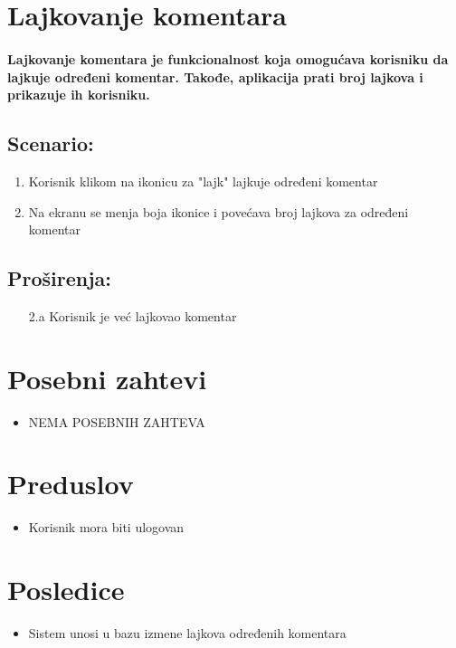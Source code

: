 \section{Lajkovanje komentara}
\paragraph{
Lajkovanje komentara je funkcionalnost koja omogućava korisniku da lajkuje određeni komentar. Takođe, aplikacija prati broj lajkova i prikazuje ih korisniku.
}

\subsection{\textbf{Scenario:}}
\begin{enumerate}
    \item Korisnik klikom na ikonicu za "lajk" lajkuje određeni komentar
    \item Na ekranu se menja boja ikonice i povećava broj lajkova za određeni komentar
\end{enumerate}
\newpage
\subsection{\textbf{Proširenja:}}

\begin{enumerate}
\color{Maroon}
  \item[2.a] Korisnik je već lajkovao komentar
\end{enumerate}
\section{Posebni zahtevi}
\begin{itemize}
    \item \color{Maroon}NEMA POSEBNIH ZAHTEVA
\end{itemize}
\section{Preduslov}
\begin{itemize}
    \item Korisnik mora biti ulogovan
\end{itemize}

\section{Posledice}
\begin{itemize}
    \item Sistem unosi u bazu izmene lajkova određenih komentara
\end{itemize}
